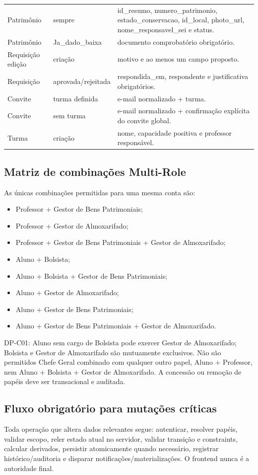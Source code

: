\begin{longtable}{>{\raggedright\arraybackslash}p{} >{\raggedright\arraybackslash}p{} >{\raggedright\arraybackslash}p{}}
Patrimônio & sempre & id\_resumo, numero\_patrimonio, estado\_conservacao, id\_local, photo\_url, nome\_responsavel\_sei e status.\\
Patrimônio & Ja\_dado\_baixa & documento comprobatório obrigatório.\\
Requisição edição & criação & motivo e ao menos um campo proposto.\\
Requisição & aprovada/rejeitada & respondida\_em, respondente e justificativa obrigatórios.\\
Convite & turma definida & e-mail normalizado + turma.\\
Convite & sem turma & e-mail normalizado + confirmação explícita do convite global.\\
Turma & criação & nome, capacidade positiva e professor responsável.\\
\bottomrule
\end{longtable}

\subsection{Matriz de combinações Multi-Role}
As únicas combinações permitidas para uma mesma conta são:
\begin{itemize}
    \item Professor + Gestor de Bens Patrimoniais;
    \item Professor + Gestor de Almoxarifado;
    \item Professor + Gestor de Bens Patrimoniais + Gestor de Almoxarifado;
    \item Aluno + Bolsista;
    \item Aluno + Bolsista + Gestor de Bens Patrimoniais;
    \item Aluno + Gestor de Almoxarifado;
    \item Aluno + Gestor de Bens Patrimoniais;
    \item Aluno + Gestor de Bens Patrimoniais + Gestor de Almoxarifado.
\end{itemize}
DP-C01: Aluno sem cargo de Bolsista pode exercer Gestor de Almoxarifado; Bolsista e Gestor de Almoxarifado são mutuamente exclusivos. Não são permitidos Chefe Geral combinado com qualquer outro papel, Aluno + Professor, nem Aluno + Bolsista + Gestor de Almoxarifado. A concessão ou remoção de papéis deve ser transacional e auditada.

\subsection{Fluxo obrigatório para mutações críticas}
Toda operação que altera dados relevantes segue: autenticar, resolver papéis, validar escopo, reler estado atual no servidor, validar transição e constraints, calcular derivados, persistir atomicamente quando necessário, registrar histórico/auditoria e disparar notificações/materializações. O frontend nunca é a autoridade final.


